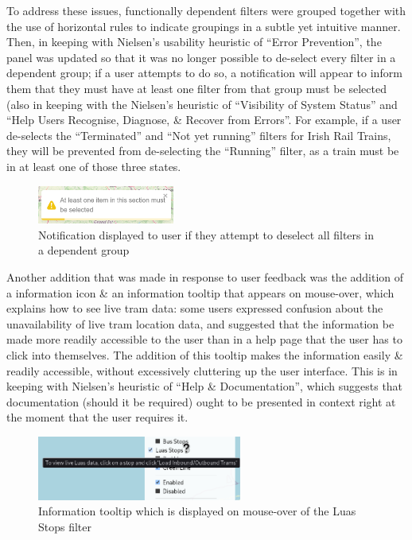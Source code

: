 \documentclass[a4paper,11pt]{report}
\begin{document}
To address these issues, functionally dependent filters were grouped together with the use of horizontal rules to indicate groupings in a subtle yet intuitive manner.
Then, in keeping with Nielsen's usability heuristic of ``Error Prevention'', the panel was updated so that it was no longer possible to de-select every filter in a dependent group;
if a user attempts to do so, a notification will appear to inform them that they must have at least one filter from that group must be selected (also in keeping with the Nielsen's heuristic of ``Visibility of System Status'' and ``Help Users Recognise, Diagnose, \& Recover from Errors''.
For example, if a user de-selects the ``Terminated'' and ``Not yet running'' filters for Irish Rail Trains, they will be prevented from de-selecting the ``Running'' filter, as a train must be in at least one of those three states.

\begin{figure}[H]
    \centering
    \includegraphics[width=0.4\textwidth]{./images/mmustselectatleastone.png}
    \caption{Notification displayed to user if they attempt to deselect all filters in a dependent group }
\end{figure}

Another addition that was made in response to user feedback was the addition of a information icon \& an information tooltip that appears on mouse-over, which explains how to see live tram data:
some users expressed confusion about the unavailability of live tram location data, and suggested that the information be made more readily accessible to the user than in a help page that the user has to click into themselves.
The addition of this tooltip makes the information easily \& readily accessible, without excessively cluttering up the user interface.
This is in keeping with Nielsen's heuristic of ``Help \& Documentation'', which suggests that documentation (should it be required) ought to be presented in context right at the moment that the user requires it.

\begin{figure}[H]
    \centering
    \includegraphics[width=0.6\textwidth]{./images/luasstopsmouseover.png}
    \caption{Information tooltip which is displayed on mouse-over of the Luas Stops filter}
\end{figure}
\end{document}
